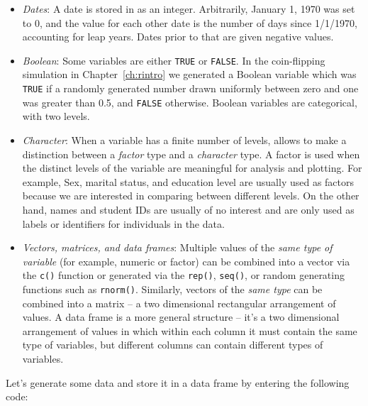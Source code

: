\begin{itemize}
\item \emph{Dates}: A date is stored in \R as an integer. Arbitrarily, January
  1, 1970 was set to 0, and the value for each other date is the number of days
  since 1/1/1970, accounting for leap years. Dates prior to that are given
  negative values.

\item \emph{Boolean}: Some variables are either \lstinline{TRUE} or
  \lstinline{FALSE}. In the coin-flipping simulation in Chapter~\ref{ch:rintro} we
  generated a Boolean variable which was \lstinline{TRUE} if a randomly generated
  number drawn uniformly between zero and one was greater than 0.5, and
  \lstinline{FALSE} otherwise. Boolean variables are categorical, with two levels.

\item \textit{Character}: When a variable has a finite number of levels, \R
  allows to make a distinction between a \emph{factor} type and a \emph{character} type. A
  factor is used when the distinct levels of the variable are meaningful for
  analysis and plotting. For example, Sex, marital status, and education level
  are usually used as factors because we are interested in comparing between
  different levels. On the other hand, names and student IDs are usually of no
  interest and are only used as labels or identifiers for individuals in the
  data.

\item \textit{Vectors, matrices, and data frames}: Multiple values of the
  \textit{same type of variable} (for example, numeric or factor) can be combined
  into a vector via the \lstinline{c()} function or generated via the \lstinline{rep()},
  \lstinline{seq()}, or random generating functions such as
  \lstinline{rnorm()}. Similarly, vectors of the \textit{same type} can be combined
  into a matrix -- a two dimensional rectangular arrangement of values. A data
  frame is a more general structure -- it's a two dimensional arrangement of
  values in which within each column it must contain the same type of variables,
  but different columns can contain different types of variables.
\end{itemize}

Let's generate some data and store it in a data frame by entering the following code:


